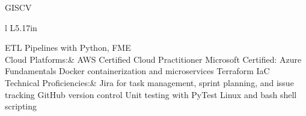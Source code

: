 \documentclass[letterpaper]{article}
\newenvironment{skillslist}
        {
            \hspace*{-0.07in}\begin{tabular}[t]{ l L{5.17in} }
        }{
            \end{tabular}
        }
\newcommand{\impt}[1]{\uline{#1}}
\begin{document}
\begin{taggedblock}{GISCV}
\begin{skillslist}
                ETL Pipelines with Python, FME \linebreak
                \\
            Cloud Platforms:&
                AWS Certified Cloud Practitioner \linebreak
                Microsoft Certified: Azure Fundamentals \linebreak
                Docker containerization and microservices \linebreak
                Terraform IaC \linebreak
                \\
            Technical Proficiencies:&
                Jira for task management, sprint planning, and issue tracking \linebreak
                GitHub version control \linebreak
                Unit testing with PyTest \linebreak
                Linux and bash shell scripting \linebreak
                \\
        \end{skillslist}
    \end{taggedblock}
\end{document}
